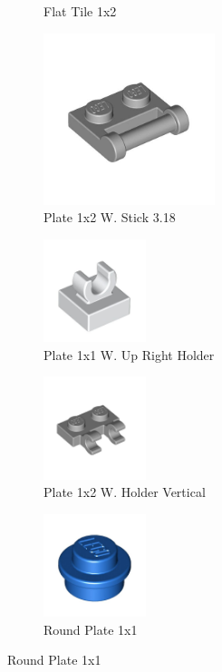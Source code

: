 \documentclass[letterpaper]{scrreprt}
\begin{document}
\begin{figure}[H]
\begin{subfigure}{0.5\textwidth}
		\caption{Flat Tile 1x2}
		\label{fig:subim3}
	\end{subfigure}
	\begin{subfigure}{0.5\textwidth}
		\includegraphics[width=0.9\linewidth, height=5cm]{Bricks/stick1x2.jpeg}
		\caption{Plate 1x2 W. Stick 3.18}
		\label{fig:subim3}
	\end{subfigure}
	\begin{subfigure}{0.5\textwidth}
		\centering
		\includegraphics[width=0.4\linewidth, height=3cm]{Bricks/1x1up.jpeg}
		\caption{Plate 1x1 W. Up Right Holder}
		\label{fig:subim3}
	\end{subfigure}
	\begin{subfigure}{0.5\textwidth}
		\centering
		\includegraphics[width=0.4\linewidth, height=3cm]{Bricks/1x2holder.jpeg}
		\caption{Plate 1x2 W. Holder Vertical}
		\label{fig:subim3}
	\end{subfigure}
	\begin{subfigure}{0.5\textwidth}
		\centering
		\includegraphics[width=0.4\linewidth, height=3cm]{Bricks/round1x1.jpeg}
		\caption{Round Plate 1x1}

\end{subfigure}
\end{figure}
\end{document}
